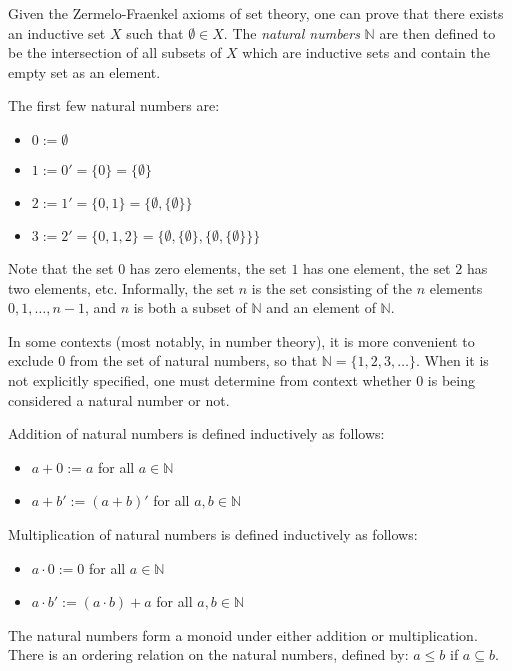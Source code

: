 \documentclass[12pt]{article}
\begin{document}
Given the Zermelo-Fraenkel axioms of set theory, one can prove that there exists an inductive set $X$ such that $\emptyset \in X$. The {\em natural numbers} $\mathbb{N}$ are then defined to be the intersection of all subsets of $X$ which are inductive sets and contain the empty set as an element.

The first few natural numbers are:
\begin{itemize}
\item $0 := \emptyset$
\item $1 := 0' = \{0\} = \{ \emptyset \}$
\item $2 := 1' = \{0,1\} = \{\emptyset, \{ \emptyset \} \}$
\item $3 := 2' = \{0,1,2\} = \{\emptyset, \{ \emptyset \}, \{ \emptyset, \{ \emptyset \} \} \}$
\end{itemize}

Note that the set $0$ has zero elements, the set $1$ has one element, the set $2$ has two elements, etc. Informally, the set $n$ is the set consisting of the $n$ elements $0, 1, \dots, n-1$, and $n$ is both a subset of $\mathbb{N}$ and an element of $\mathbb{N}$.

In some contexts (most notably, in number theory), it is more convenient to exclude $0$ from the set of natural numbers, so that $\mathbb{N} = \{1,2,3,\dots\}$. When it is not explicitly specified, one must determine from context whether $0$ is being considered a natural number or not.

Addition of natural numbers is defined inductively as follows:
\begin{itemize}
\item $a + 0 := a$ for all $a \in \mathbb{N}$
\item $a + b' := (a+b)'$ for all $a,b \in \mathbb{N}$
\end{itemize}

Multiplication of natural numbers is defined inductively as follows:
\begin{itemize}
\item $a \cdot 0 := 0$ for all $a \in \mathbb{N}$
\item $a \cdot b' := (a\cdot b) + a$ for all $a,b \in \mathbb{N}$
\end{itemize}
The natural numbers form a monoid under either addition or multiplication. There is an ordering relation on the natural numbers, defined by: $a \leq b$ if $a \subseteq b$.
\end{document}
